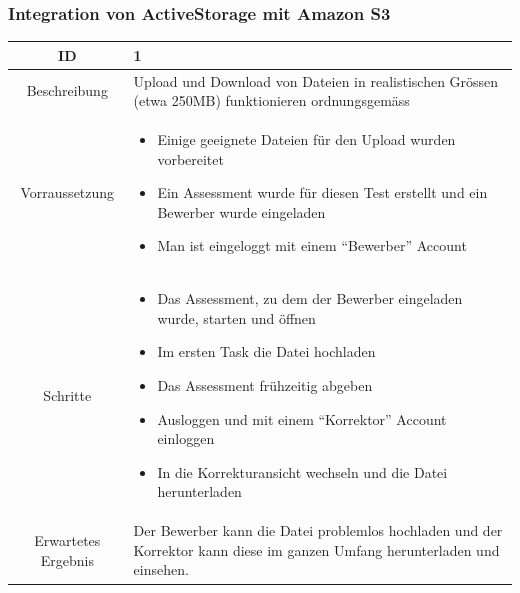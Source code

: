 \subsubsection{Integration von ActiveStorage mit Amazon S3}
\begin{tabularx}{\textwidth}[H]{|>{\columncolor{red!30}}c|X|}
    \hline
    ID & 1 \\ 
    \hline

    Beschreibung &
    Upload und Download von Dateien in realistischen Grössen (etwa 250MB) funktionieren ordnungsgemäss
    \\ \hline

    Vorraussetzung &
    \begin{itemize}
        \item Einige geeignete Dateien für den Upload wurden vorbereitet
        \item Ein Assessment wurde für diesen Test erstellt und ein Bewerber wurde eingeladen
        \item Man ist eingeloggt mit einem \enquote{Bewerber} Account
    \end{itemize}
    \\ \hline

    Schritte & 
    \begin{itemize}
        \item Das Assessment, zu dem der Bewerber eingeladen wurde, starten und öffnen
        \item Im ersten Task die Datei hochladen
        \item Das Assessment frühzeitig abgeben
        \item Ausloggen und mit einem \enquote{Korrektor} Account einloggen
        \item In die Korrekturansicht wechseln und die Datei herunterladen
    \end{itemize}
    \\ \hline

    Erwartetes Ergebnis &
    Der Bewerber kann die Datei problemlos hochladen und der Korrektor kann diese im ganzen Umfang herunterladen und einsehen. 
    \\ \hline
\end{tabularx}

